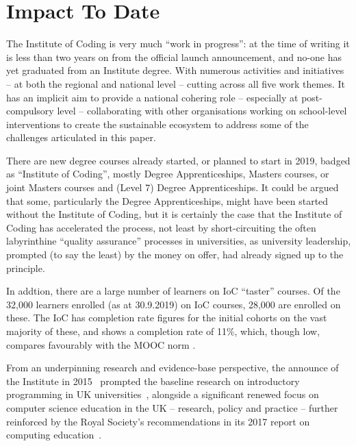 \documentclass[conference]{IEEEtran}
\begin{document}
\section{Impact To Date}\label{impact}

The Institute of Coding is very much ``work in progress'': at the time
of writing it is less than two years on from the official launch
announcement, and no-one has yet graduated from an Institute degree.  With numerous activities and initiatives -- at both the
regional and national level -- cutting across all five work themes. It
has an implicit aim to provide a national cohering role -- especially
at post-compulsory level -- collaborating with other organisations
working on school-level interventions to create the sustainable
ecosystem to address some of the challenges articulated in this paper.

There are new degree courses already started, or planned to start in 2019,
badged as ``Institute of Coding'', mostly Degree Apprenticeships,
Masters courses, or joint Masters courses and (Level 7) Degree
Apprenticeships.  It could be argued that some, particularly the
Degree Apprenticeships, might have been started without the Institute
of Coding, but it is certainly the case that the Institute of Coding
has accelerated the process, not least by short-circuiting the often
labyrinthine ``quality assurance'' processes in universities, as
university leadership, prompted (to say the least) by the money on
offer, had already signed up to the principle.

In addtion, there are a large number of learners on IoC ``taster'' courses. Of the 32,000 learners enrolled (as at 30.9.2019) on IoC courses, 28,000 are enrolled on these.  The IoC has completion rate figures for the initial cohorts on the vast majority of these, and shows a completion rate of 11\%, which, though low, compares favourably with the MOOC norm \cite{ReichRuiperezValiente2019a}.

From an underpinning research and evidence-base perspective, the
announce of the Institute in 2015~\cite{HMG2015a} prompted the
baseline research on introductory programming in UK
universities~\cite{murphy-et-al:programming2017,simon-et-al:sigcse2018},
alongside a significant renewed focus on computer science education in
the UK -- research, policy and practice -- further reinforced by the
Royal Society's recommendations in its 2017 report on computing
education~\cite{rs:2017}.

\end{document}
